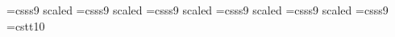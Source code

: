 




\font\titlefont=csss9 scaled
\font\middlefont=csss9 scaled
\font\textfont=csss9 scaled
\font\bbulletfont=csss9 scaled
\font\authorfont=csss9 scaled
\font\headerfont=csss9
\font\codefont=cstt10

\textfont

\def\hilitecolor{1 1 0}
\def\hhilitecolor{0 1 1}
\def\textcolor{0.7 0.7 0.7}
\def\pagenocolor{0.031 0.015 0.368}
\def\inactcolor{0.4 0.4 0.4}

\newbox\imgboxright \newbox\imgboxleft \newbox\textbox \newbox\bulletbox
\newdimen\textboxwidth \newdimen\tmpwidth \newbox\tmpbox
\newdimen\maxboxsize \newcount\oldpageno

\def\hilite#1{\special{color rgb \hilitecolor}#1\special{color rgb \textcolor}}

\def\hhilite#1{\special{color rgb \hhilitecolor}#1\special{color rgb \textcolor}}

\def\bullet#1{\ifx\firstbullet1\gdef\firstbullet{0}\else\vskip7pt\fi
\tmpwidth=\textboxwidth\advance\tmpwidth by-0.25in
\setbox\bulletbox=\vbox{\hsize=\tmpwidth{#1}}
\hbox{\hskip -12pt \vbox to\ht\bulletbox{\hsize=4mm\char126\vfil}\box\bulletbox}}
\def\bbullet#1{\ifx\firstbullet1\gdef\firstbullet{0}\else\vskip5pt\fi
\tmpwidth=\textboxwidth\advance\tmpwidth by-0.75in
\setbox\bulletbox=\vbox{\hsize=\tmpwidth\bbulletfont{#1}}
\hbox{\hskip 24pt \vbox to\ht\bulletbox{\hsize=4mm\bbulletfont*\vfil}\box\bulletbox}}

